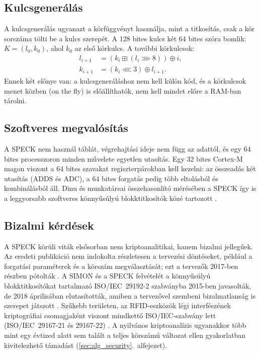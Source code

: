 \documentclass[a4paper,12pt]{report}
\theoremstyle{definition}
\theoremstyle{remark}
\begin{document}
\subsection{Kulcsgenerálás}\label{sec:speck_kulcs}

A kulcsgenerálás ugyanazt a körfüggvényt használja, mint a titkosítás, csak a kör sorszáma tölti be a kulcs szerepét. A 128 bites kulcs két 64 bites szóra bomlik: $K = (l_0, k_0)$, ahol $k_0$ az első körkulcs. A további körkulcsok:
\begin{align}
l_{i+1} &= (k_i \mathbin{\boxplus} (l_i \ggg 8)) \oplus i, \\
k_{i+1} &= (k_i \lll 3) \oplus l_{i+1}.
\end{align}
Ennek két előnye van: a kulcsgeneráláshoz nem kell külön kód, és a körkulcsok menet közben (on the fly) is előállíthatók, nem kell mindet előre a RAM-ban tárolni.

\subsection{Szoftveres megvalósítás}

A SPECK nem használ táblát, végrehajtási ideje nem függ az adattól, és egy 64 bites processzoron minden művelete egyetlen utasítás. Egy 32 bites Cortex-M magon viszont a 64 bites szavakat regiszterpárokban kell kezelni: az összeadás két utasítás (ADDS és ADC), a 64 bites forgatás pedig több eltolásból és kombinálásból áll. Dinu és munkatársai összehasonlító mérésében a SPECK így is a leggyorsabb szoftveres könnyűsúlyú blokktitkosítók közé tartozott \cite{Dinu2015}.

\subsection{Bizalmi kérdések}

A SPECK körüli viták elsősorban nem kriptoanalitikai, hanem bizalmi jellegűek. Az eredeti publikáció nem indokolta részletesen a tervezési döntéseket, például a forgatási paraméterek és a körszám megválasztását; ezt a tervezők 2017-ben részben pótolták \cite{Beaulieu2017}. A SIMON és a SPECK felvételét a könnyűsúlyú blokktitkosítókat tartalmazó ISO/IEC~29192-2 szabványba 2015-ben javasolták, de 2018 áprilisában elutasították, amiben a tervezővel szembeni bizalmatlanság is szerepet játszott \cite{Ashur2021}. Szűkebb területen, az RFID-eszközök légi interfészének kriptográfiai csomagjaként viszont mindkettő ISO/IEC-szabvány lett (ISO/IEC~29167-21 és 29167-22) \cite{ISO29167}. A nyilvános kriptoanalízis ugyanakkor több mint egy évtized alatt sem talált a teljes körszámú változat ellen gyakorlatban kivitelezhető támadást (\ref{sec:alg_security}.~alfejezet).
\end{document}
